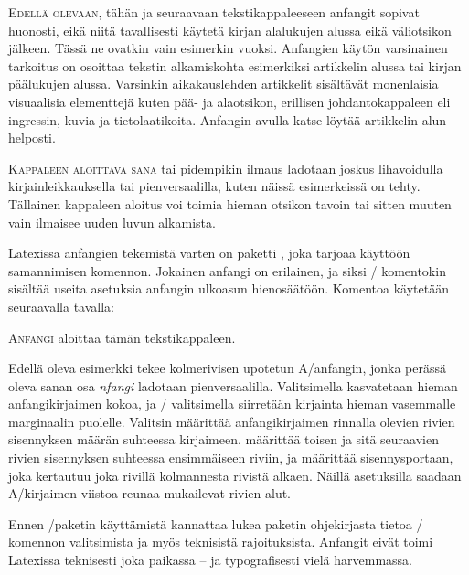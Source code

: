 \medbreak

\lettrine[lines=2, lhang=1, nindent=0bp]{E\hspace{1.5bp}}{dellä
  olevaan}, tähän ja seuraavaan tekstikappaleeseen anfangit sopivat
huonosti, eikä niitä tavallisesti käytetä kirjan alalukujen alussa eikä
väliotsikon jälkeen. Tässä ne ovatkin vain esimerkin vuoksi. Anfangien
käytön varsinainen tarkoitus on osoittaa tekstin alkamiskohta
esimerkiksi artikkelin alussa tai kirjan päälukujen alussa. Varsinkin
aikakauslehden artikkelit sisältävät monenlaisia visuaalisia elementtejä
kuten pää- ja alaotsikon, erillisen johdantokappaleen eli ingressin,
kuvia ja tietolaatikoita. Anfangin avulla katse löytää artikkelin alun
helposti.

\lettrine[lines=1, loversize=.1, lhang=.02, findent=1.5bp]{K}{appaleen
  aloittava sana} tai pidempikin ilmaus ladotaan joskus lihavoidulla
kirjainleikkauksella tai pienversaalilla, kuten näissä esimerkeissä on
tehty. Tällainen kappaleen aloitus voi toimia hieman otsikon tavoin tai
sitten muuten vain ilmaisee uuden luvun alkamista.

Latexissa anfangien tekemistä varten on paketti ,
joka tarjoaa käyttöön samannimisen komennon. Jokainen anfangi on
erilainen, ja siksi \-/ komentokin sisältää useita
asetuksia anfangin ulkoasun hienosäätöön. Komentoa käytetään seuraavalla
tavalla:

\begin{koodilohkosis}
\lettrine[lines=3, loversize=.06, lhang=.02, findent=-5bp,
  nindent=4bp, slope=4bp]{A}{nfangi} aloittaa tämän tekstikappaleen.
\end{koodilohkosis}

\noindent
Edellä oleva esimerkki tekee kolmerivisen upotetun A\-/anfangin, jonka
perässä oleva sanan osa \emph{nfangi} ladotaan pienversaalilla.
Valitsimella  kasvatetaan hieman anfangikirjaimen
kokoa, ja \-/ valitsimella siirretään kirjainta hieman
vasemmalle marginaalin puolelle. Valitsin  määrittää
anfangikirjaimen rinnalla olevien rivien sisennyksen määrän suhteessa
kirjaimeen.  määrittää toisen ja sitä seuraavien rivien
sisennyksen suhteessa ensimmäiseen riviin, ja  määrittää
sisennysportaan, joka kertautuu joka rivillä kolmannesta rivistä alkaen.
Näillä asetuksilla saadaan A\-/kirjaimen viistoa reunaa mukailevat
rivien alut.

Ennen \-/paketin käyttämistä kannattaa lukea paketin
ohjekirjasta tietoa \-/ komennon valitsimista ja myös
teknisistä rajoituksista. Anfangit eivät toimi Latexissa teknisesti joka
paikassa -- ja typografisesti vielä harvemmassa.

